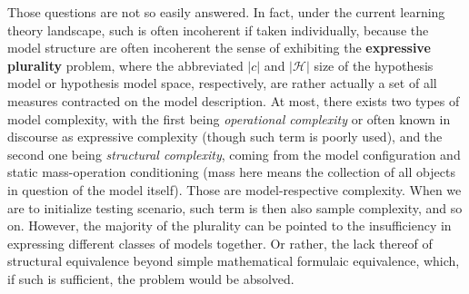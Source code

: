 Those questions are not so easily answered. In fact, under the current learning theory landscape, such is often incoherent if taken individually, because the model structure are often incoherent the sense of exhibiting the \textbf{expressive plurality} problem, where the abbreviated $|c|$ and $|\mathcal{H}|$ size of the hypothesis model or hypothesis model space, respectively, are rather actually a set of all measures contracted on the model description. At most, there exists two types of model complexity, with the first being \textit{operational complexity} or often known in discourse as expressive complexity (though such term is poorly used), and the second one being \textit{structural complexity}, coming from the model configuration and static mass-operation conditioning (mass here means the collection of all objects in question of the model itself). Those are model-respective complexity. When we are to initialize testing scenario, such term is then also sample complexity, and so on. However, the majority of the plurality can be pointed to the insufficiency in expressing different classes of models together. Or rather, the lack thereof of structural equivalence beyond simple mathematical formulaic equivalence, which, if such is sufficient, the problem would be absolved. 

